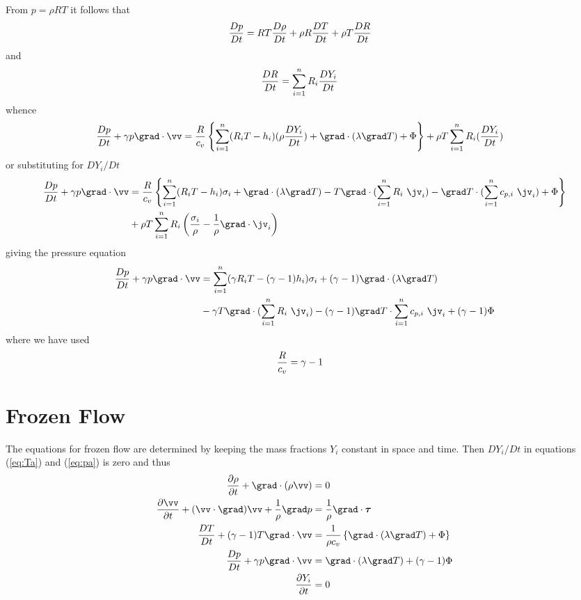 \documentclass[10pt]{article}
\begin{document}
From $p=\rho R T$ it follows that
\begin{align}
    {D p\over Dt} &=  RT {D \rho\over Dt} + \rho R  {D T\over Dt} + \rho T  {D R\over Dt}
\end{align}
and
\begin{align}
   {D R\over Dt} &=  \sum_{i=1}^n R_i {D Y_i \over Dt}
\end{align}
whence
\begin{align}
    {D p\over Dt} + \gamma p \grad\cdot\vv &= 
       {R\over c_v}  \left\{ \sumi  (R_i T-h_i) (\rho{D Y_i \over Dt}) + \grad\cdot(\lambda\grad T)
              + \Phi \right\}   + \rho T \sumi R_i ({D Y_i \over Dt}) \label{eq:pa}
\end{align}
or substituting for $DY_i/Dt$ 
\begin{align}
    {D p\over Dt} + \gamma p \grad\cdot\vv &= 
       {R\over c_v}  \left\{ \sumi  (R_i T-h_i) \sigma_i + \grad\cdot(\lambda\grad T)
      - T \grad\cdot( \sumi  R_i ~\jv_i) - \grad T \cdot ( \sumi c_{p,i} ~\jv_i )
              + \Phi \right\} \\
      & + \rho T \sumi R_i \left( {\sigma_i \over \rho} - {1\over\rho}\grad\cdot\jv_i  \right)
\end{align}
giving the pressure equation 
\begin{align}
    {D p\over Dt} + \gamma p \grad\cdot\vv &= 
        \sumi  ({\gamma R_i} T- (\gamma-1)h_i) \sigma_i + (\gamma-1) \grad\cdot(\lambda\grad T) \\
    &  - \gamma T \grad\cdot( \sumi R_i~\jv_i) - (\gamma-1)\grad T \cdot \sumi c_{p,i}~\jv_i
              + (\gamma-1) \Phi 
\end{align}
where we have used
\begin{align}
   {R\over c_v} &= \gamma -1
\end{align}


\section{Frozen Flow}
 The equations for frozen flow are determined by keeping the mass fractions $Y_i$ constant in space and
time. Then $DY_i/Dt$ in equations (\ref{eq:Ta}) and (\ref{eq:pa}) is zero and thus
\begin{align*}
   {\partial \rho  \over \partial t} + \grad\cdot(\rho \vv)&=0 \\
   {\partial \vv  \over \partial t}  + (\vv\cdot\grad)\vv +{1\over\rho} \grad p &= {1\over\rho}\grad\cdot\tauv \\
  {D T\over Dt} + (\gamma-1) T \grad\cdot\vv & = 
       {1\over \rho c_v}  \left\{ \grad\cdot(\lambda\grad T) + \Phi \right\} \\
    {D p\over Dt} + \gamma p \grad\cdot\vv &=  \grad\cdot(\lambda\grad T) + (\gamma-1) \Phi  \\
   {\partial Y_i  \over \partial t} & = 0 
\end{align*}
\end{document}
